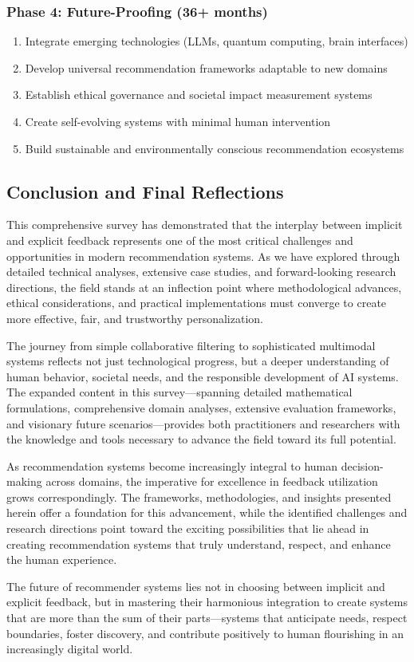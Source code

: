 \subsubsection{Phase 4: Future-Proofing (36+ months)}

\begin{enumerate}
    \item Integrate emerging technologies (LLMs, quantum computing, brain interfaces)
    \item Develop universal recommendation frameworks adaptable to new domains
    \item Establish ethical governance and societal impact measurement systems
    \item Create self-evolving systems with minimal human intervention
    \item Build sustainable and environmentally conscious recommendation ecosystems
\end{enumerate}

\subsection{Conclusion and Final Reflections}

This comprehensive survey has demonstrated that the interplay between implicit and explicit feedback represents one of the most critical challenges and opportunities in modern recommendation systems. As we have explored through detailed technical analyses, extensive case studies, and forward-looking research directions, the field stands at an inflection point where methodological advances, ethical considerations, and practical implementations must converge to create more effective, fair, and trustworthy personalization.

The journey from simple collaborative filtering to sophisticated multimodal systems reflects not just technological progress, but a deeper understanding of human behavior, societal needs, and the responsible development of AI systems. The expanded content in this survey—spanning detailed mathematical formulations, comprehensive domain analyses, extensive evaluation frameworks, and visionary future scenarios—provides both practitioners and researchers with the knowledge and tools necessary to advance the field toward its full potential.

As recommendation systems become increasingly integral to human decision-making across domains, the imperative for excellence in feedback utilization grows correspondingly. The frameworks, methodologies, and insights presented herein offer a foundation for this advancement, while the identified challenges and research directions point toward the exciting possibilities that lie ahead in creating recommendation systems that truly understand, respect, and enhance the human experience.

The future of recommender systems lies not in choosing between implicit and explicit feedback, but in mastering their harmonious integration to create systems that are more than the sum of their parts—systems that anticipate needs, respect boundaries, foster discovery, and contribute positively to human flourishing in an increasingly digital world.
